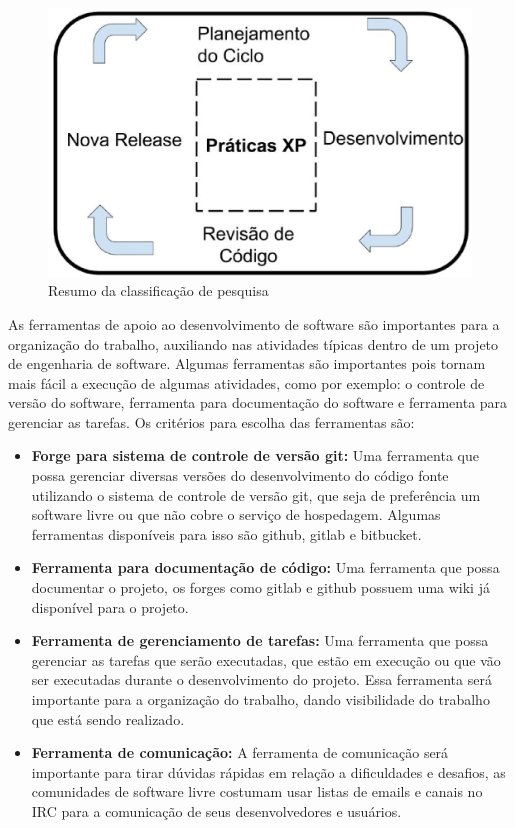 \begin{figure}[h]
  \centering
  \includegraphics[width=1.0\textwidth]
      {figuras/desenvolvimento.eps}
  \caption{Resumo da classificação de pesquisa}
\label{fig:def}
\end{figure}

As ferramentas de apoio ao desenvolvimento de software são importantes para a
organização do trabalho, auxiliando nas atividades típicas dentro de um projeto
de engenharia de software. Algumas ferramentas são importantes pois tornam mais fácil
a execução de algumas atividades, como por exemplo: o controle de versão do software,
ferramenta para documentação do software e ferramenta para gerenciar as tarefas.
Os critérios para escolha das ferramentas são:

\begin{itemize}
  \item \textbf{Forge para sistema de controle de versão git:} Uma ferramenta que
  possa gerenciar diversas versões do desenvolvimento do código fonte utilizando
  o sistema de controle de versão git, que seja de preferência um software livre
  ou que não cobre o serviço de hospedagem. Algumas ferramentas disponíveis para
  isso são github, gitlab e bitbucket.
  \item \textbf{Ferramenta para documentação de código:} Uma ferramenta que possa
  documentar o projeto, os forges como gitlab e github possuem uma wiki já disponível
  para o projeto.
  \item \textbf{Ferramenta de gerenciamento de tarefas:} Uma ferramenta que possa
  gerenciar as tarefas que serão executadas, que estão em execução ou que vão ser executadas
  durante o desenvolvimento do projeto. Essa ferramenta será importante para a
  organização do trabalho, dando visibilidade do trabalho que está sendo realizado.
  \item \textbf{Ferramenta de comunicação:} A ferramenta de comunicação será
  importante para tirar dúvidas rápidas em relação a dificuldades e desafios, as
  comunidades de software livre costumam usar listas de emails e canais no IRC
  para a comunicação de seus desenvolvedores e usuários.
\end{itemize}

